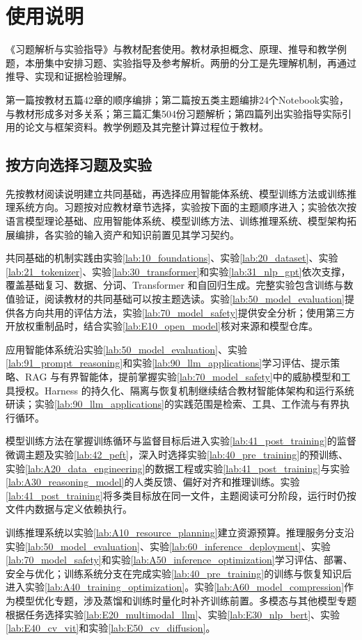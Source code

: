 \chapter*{使用说明}

《习题解析与实验指导》与教材配套使用。教材承担概念、原理、推导和教学例题，本册集中安排习题、实验指导及参考解析。两册的分工是先理解机制，再通过推导、实现和证据检验理解。

第一篇按教材五篇42章的顺序编排；第二篇按五类主题编排24个Notebook实验，与教材形成多对多关系；第三篇汇集504份习题解析；第四篇列出实验指导实际引用的论文与框架资料。教学例题及其完整计算过程位于教材。

\section*{按方向选择习题及实验}
先按教材阅读说明建立共同基础，再选择应用智能体系统、模型训练方法或训练推理系统方向。习题按对应教材章节选择，实验按下面的主题顺序进入；实验依次按语言模型理论基础、应用智能体系统、模型训练方法、训练推理系统、模型架构拓展编排，各实验的输入资产和知识前置见其学习契约。

共同基础的机制实践由实验\ref{lab:10_foundations}、实验\ref{lab:20_dataset}、实验\ref{lab:21_tokenizer}、实验\ref{lab:30_transformer}和实验\ref{lab:31_nlp_gpt}依次支撑，覆盖基础复习、数据、分词、Transformer 和自回归生成。完整实验包含训练与数值验证，阅读教材的共同基础可以按主题选读。实验\ref{lab:50_model_evaluation}提供各方向共用的评估方法，实验\ref{lab:70_model_safety}提供安全分析；使用第三方开放权重制品时，结合实验\ref{lab:E10_open_model}核对来源和模型仓库。

应用智能体系统沿实验\ref{lab:50_model_evaluation}、实验\ref{lab:91_prompt_reasoning}和实验\ref{lab:90_llm_applications}学习评估、提示策略、RAG 与有界智能体，提前掌握实验\ref{lab:70_model_safety}中的威胁模型和工具授权。Harness 的持久化、隔离与恢复机制继续结合教材智能体架构和运行系统研读；实验\ref{lab:90_llm_applications}的实践范围是检索、工具、工作流与有界执行循环。

模型训练方法在掌握训练循环与监督目标后进入实验\ref{lab:41_post_training}的监督微调主题及实验\ref{lab:42_peft}，深入时选择实验\ref{lab:40_pre_training}的预训练、实验\ref{lab:A20_data_engineering}的数据工程或实验\ref{lab:41_post_training}与实验\ref{lab:A30_reasoning_model}的人类反馈、偏好对齐和推理训练。实验\ref{lab:41_post_training}将多类目标放在同一文件，主题阅读可分阶段，运行时仍按文件内数据与定义依赖执行。

训练推理系统以实验\ref{lab:A10_resource_planning}建立资源预算。推理服务分支沿实验\ref{lab:50_model_evaluation}、实验\ref{lab:60_inference_deployment}、实验\ref{lab:70_model_safety}和实验\ref{lab:A50_inference_optimization}学习评估、部署、安全与优化；训练系统分支在完成实验\ref{lab:40_pre_training}的训练与恢复知识后进入实验\ref{lab:A40_training_optimization}。实验\ref{lab:A60_model_compression}作为模型优化专题，涉及蒸馏和训练时量化时补齐训练前置。多模态与其他模型专题根据任务选择实验\ref{lab:E20_multimodal_llm}、实验\ref{lab:E30_nlp_bert}、实验\ref{lab:E40_cv_vit}和实验\ref{lab:E50_cv_diffusion}。

